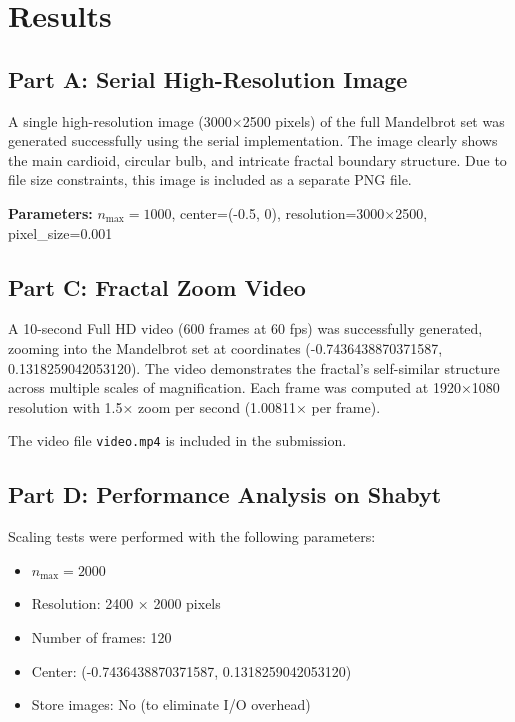 \documentclass[11pt,a4paper]{article}
\begin{document}
	\section{Results}
	
	\subsection{Part A: Serial High-Resolution Image}
	
	A single high-resolution image (3000×2500 pixels) of the full Mandelbrot set was generated successfully using the serial implementation. The image clearly shows the main cardioid, circular bulb, and intricate fractal boundary structure. Due to file size constraints, this image is included as a separate PNG file.
	
	\textbf{Parameters:} $n_{\text{max}}=1000$, center=(-0.5, 0), resolution=3000×2500, pixel\_size=0.001
	
	\subsection{Part C: Fractal Zoom Video}
	
	A 10-second Full HD video (600 frames at 60 fps) was successfully generated, zooming into the Mandelbrot set at coordinates (-0.7436438870371587, 0.1318259042053120). The video demonstrates the fractal's self-similar structure across multiple scales of magnification. Each frame was computed at 1920×1080 resolution with 1.5× zoom per second (1.00811× per frame).
	
	The video file \texttt{video.mp4} is included in the submission.
	
	\subsection{Part D: Performance Analysis on Shabyt}
	
	Scaling tests were performed with the following parameters:
	\begin{itemize}
		\item $n_{\text{max}} = 2000$
		\item Resolution: 2400 × 2000 pixels
		\item Number of frames: 120
		\item Center: (-0.7436438870371587, 0.1318259042053120)
		\item Store images: No (to eliminate I/O overhead)
	\end{itemize}
	
\end{document}
